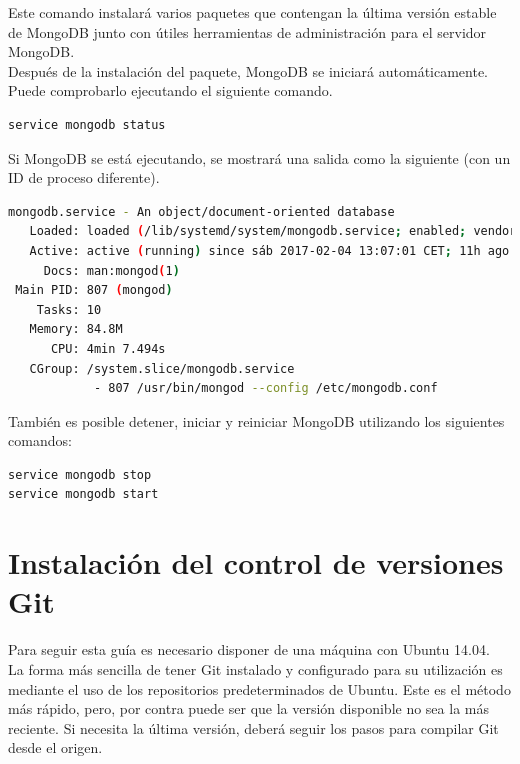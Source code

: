 \begin{appendices}
Este comando instalará varios paquetes que contengan la última versión estable de MongoDB junto con útiles herramientas de administración para el servidor MongoDB.\\

Después de la instalación del paquete, MongoDB se iniciará automáticamente. Puede comprobarlo ejecutando el siguiente comando.\\

\begin{lstlisting}[language=bash]
service mongodb status
\end{lstlisting}

Si MongoDB se está ejecutando, se mostrará una salida como la siguiente (con un ID de proceso diferente).\\

\begin{lstlisting}[language=bash]
 mongodb.service - An object/document-oriented database
   Loaded: loaded (/lib/systemd/system/mongodb.service; enabled; vendor preset: enabled)
   Active: active (running) since sáb 2017-02-04 13:07:01 CET; 11h ago
     Docs: man:mongod(1)
 Main PID: 807 (mongod)
    Tasks: 10
   Memory: 84.8M
      CPU: 4min 7.494s
   CGroup: /system.slice/mongodb.service
            - 807 /usr/bin/mongod --config /etc/mongodb.conf
\end{lstlisting}

También es posible detener, iniciar y reiniciar MongoDB utilizando los siguientes comandos:\\

\begin{lstlisting}[language=bash]
service mongodb stop
service mongodb start
\end{lstlisting}


\section{Instalación del control de versiones Git}

Para seguir esta guía es necesario disponer de una máquina con Ubuntu 14.04.\\

La forma más sencilla de tener Git instalado y configurado para su utilización es mediante el uso de los repositorios predeterminados de Ubuntu. 
Este es el método más rápido, pero, por contra puede ser que la versión disponible no sea la más reciente. 
Si necesita la última versión, deberá seguir los pasos para compilar Git desde el origen.\\


\end{appendices}
